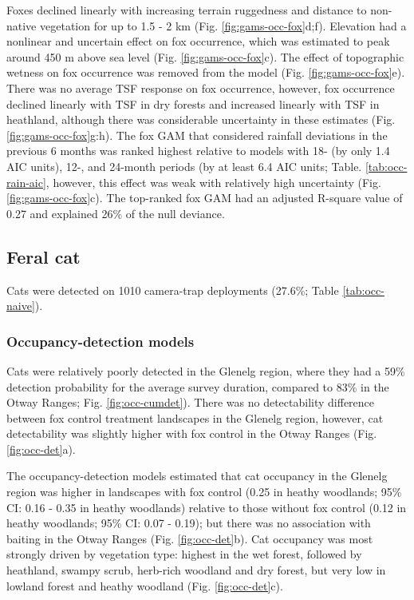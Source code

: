 \documentclass[11pt,a4paper,titlepage,twoside,openright]{style/unimelbthesis}
\begin{document}
\begin{mainmatter}
Foxes declined linearly with increasing terrain ruggedness and distance to non-native vegetation for up to 1.5 - 2 km (Fig. \ref{fig:gams-occ-fox}d;f). Elevation had a nonlinear and uncertain effect on fox occurrence, which was estimated to peak around 450 m above sea level (Fig. \ref{fig:gams-occ-fox}c). The effect of topographic wetness on fox occurrence was removed from the model (Fig. \ref{fig:gams-occ-fox}e). There was no average TSF response on fox occurrence, however, fox occurrence declined linearly with TSF in dry forests and increased linearly with TSF in heathland, although there was considerable uncertainty in these estimates (Fig. \ref{fig:gams-occ-fox}g:h). The fox GAM that considered rainfall deviations in the previous 6 months was ranked highest relative to models with 18- (by only 1.4 AIC units), 12-, and 24-month periods (by at least 6.4 AIC units; Table. \ref{tab:occ-rain-aic}, however, this effect was weak with relatively high uncertainty (Fig. \ref{fig:gams-occ-fox}c). The top-ranked fox GAM had an adjusted R-square value of 0.27 and explained 26\% of the null deviance.

\hypertarget{feral-cat-1}{%
\subsection{Feral cat}\label{feral-cat-1}}

Cats were detected on 1010 camera-trap deployments (27.6\%; Table \ref{tab:occ-naive}).

\hypertarget{occupancy-detection-models-2}{%
\subsubsection{Occupancy-detection models}\label{occupancy-detection-models-2}}

Cats were relatively poorly detected in the Glenelg region, where they had a 59\% detection probability for the average survey duration, compared to 83\% in the Otway Ranges; Fig. \ref{fig:occ-cumdet}). There was no detectability difference between fox control treatment landscapes in the Glenelg region, however, cat detectability was slightly higher with fox control in the Otway Ranges (Fig. \ref{fig:occ-det}a).

The occupancy-detection models estimated that cat occupancy in the Glenelg region was higher in landscapes with fox control (0.25 in heathy woodlands; 95\% CI: 0.16 - 0.35 in heathy woodlands) relative to those without fox control (0.12 in heathy woodlands; 95\% CI: 0.07 - 0.19); but there was no association with baiting in the Otway Ranges (Fig. \ref{fig:occ-det}b). Cat occupancy was most strongly driven by vegetation type: highest in the wet forest, followed by heathland, swampy scrub, herb-rich woodland and dry forest, but very low in lowland forest and heathy woodland (Fig. \ref{fig:occ-det}c).


\end{mainmatter}
\end{document}
